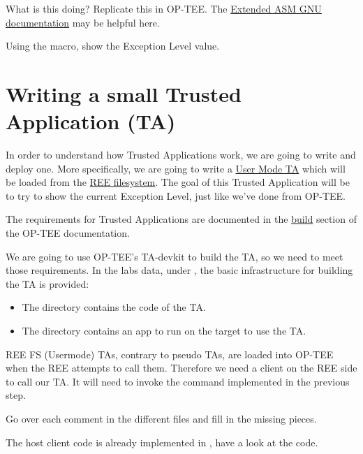 What is this doing? Replicate this in OP-TEE. The
\href{https://gcc.gnu.org/onlinedocs/gcc/Extended-Asm.html}{Extended ASM GNU
documentation} may be helpful here.

Using the  macro, show the Exception Level value.

\section{Writing a small Trusted Application (TA)}

In order to understand how Trusted Applications work, we are going to write and deploy one.
More specifically, we are going to write a 
\href{https://optee.readthedocs.io/en/latest/architecture/trusted_applications.html\#user-mode-trusted-applications}{User Mode TA}
which will be loaded from the \href{https://optee.readthedocs.io/en/latest/architecture/trusted_applications.html\#ree-filesystem-ta}{REE filesystem}.
The goal of this Trusted Application will be to try to show the current
Exception Level, just like we've done from OP-TEE.

The requirements for Trusted Applications are documented in the
\href{https://optee.readthedocs.io/en/latest/building/trusted_applications.html}{build} section of the OP-TEE documentation.

We are going to use OP-TEE's TA-devkit to build the TA, so we need to meet those requirements.
In the labs data, under ,
the basic infrastructure for building the TA is provided:

\begin{itemize}
  \item The  directory contains the code of the TA.
  \item The  directory contains an app to run on the target to use
    the TA.
\end{itemize}

REE FS (Usermode) TAs, contrary to pseudo TAs, are loaded into OP-TEE when the REE attempts to call them.
Therefore we need a client on the REE side to call our TA.
It will need to invoke the command implemented in the previous step.

Go over each  comment in the different files and fill in the missing
pieces.

The host client code is already implemented in
,
have a look at the code.

